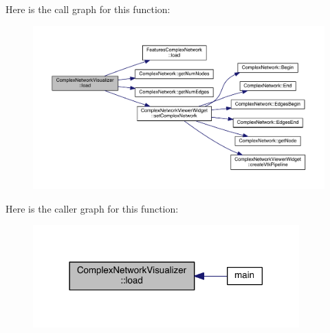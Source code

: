 Here is the call graph for this function\+:\nopagebreak
\begin{figure}[H]
\begin{center}
\leavevmode
\includegraphics[width=350pt]{class_complex_network_visualizer_a0d903a9d363d23aa9ec1e2481ee8018b_cgraph}
\end{center}
\end{figure}




Here is the caller graph for this function\+:\nopagebreak
\begin{figure}[H]
\begin{center}
\leavevmode
\includegraphics[width=290pt]{class_complex_network_visualizer_a0d903a9d363d23aa9ec1e2481ee8018b_icgraph}
\end{center}
\end{figure}




